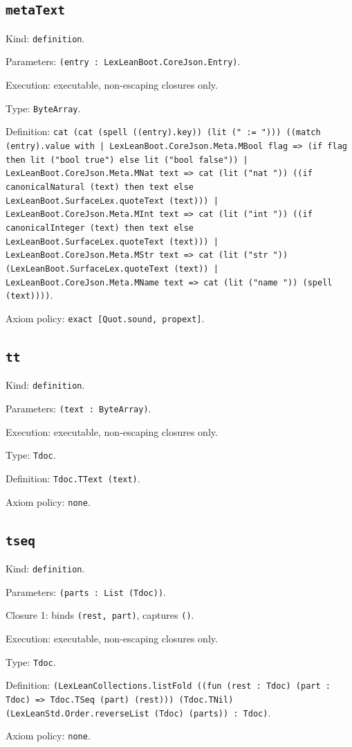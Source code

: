 \documentclass[11pt]{article}
\begin{document}
\subsection*{\texttt{metaText}}
\noindent Kind: \texttt{definition}.\par
\noindent Parameters: \texttt{(entry : LexLeanBoot.CoreJson.Entry)}.\par
\noindent Execution: executable, non-escaping closures only.\par
\noindent Type: \texttt{ByteArray}.\par
\noindent Definition: \texttt{cat (cat (spell ((entry).key)) (lit (" := "))) ((match (entry).value with | LexLeanBoot.CoreJson.Meta.MBool flag => (if flag then lit ("bool true") else lit ("bool false")) | LexLeanBoot.CoreJson.Meta.MNat text => cat (lit ("nat ")) ((if canonicalNatural (text) then text else LexLeanBoot.SurfaceLex.quoteText (text))) | LexLeanBoot.CoreJson.Meta.MInt text => cat (lit ("int ")) ((if canonicalInteger (text) then text else LexLeanBoot.SurfaceLex.quoteText (text))) | LexLeanBoot.CoreJson.Meta.MStr text => cat (lit ("str ")) (LexLeanBoot.SurfaceLex.quoteText (text)) | LexLeanBoot.CoreJson.Meta.MName text => cat (lit ("name ")) (spell (text))))}.\par
\noindent Axiom policy: \texttt{exact [Quot.sound, propext]}.\par
\subsection*{\texttt{tt}}
\noindent Kind: \texttt{definition}.\par
\noindent Parameters: \texttt{(text : ByteArray)}.\par
\noindent Execution: executable, non-escaping closures only.\par
\noindent Type: \texttt{Tdoc}.\par
\noindent Definition: \texttt{Tdoc.TText (text)}.\par
\noindent Axiom policy: \texttt{none}.\par
\subsection*{\texttt{tseq}}
\noindent Kind: \texttt{definition}.\par
\noindent Parameters: \texttt{(parts : List (Tdoc))}.\par
\noindent Closure 1: binds \texttt{(rest, part)}, captures \texttt{()}.\par
\noindent Execution: executable, non-escaping closures only.\par
\noindent Type: \texttt{Tdoc}.\par
\noindent Definition: \texttt{(LexLeanCollections.listFold ((fun (rest : Tdoc) (part : Tdoc) => Tdoc.TSeq (part) (rest))) (Tdoc.TNil) (LexLeanStd.Order.reverseList (Tdoc) (parts)) : Tdoc)}.\par
\noindent Axiom policy: \texttt{none}.\par
\end{document}
